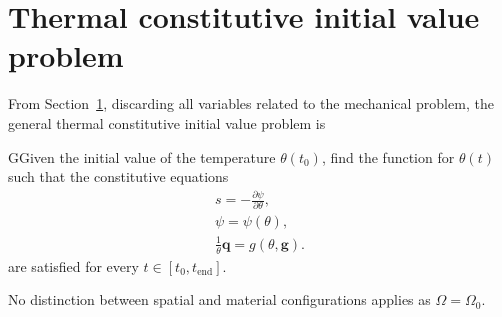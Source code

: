 \section{Thermal constitutive initial value problem}

From Section~\ref{}, discarding all variables related to the mechanical problem, the general thermal constitutive initial value problem is
\begin{problem}
GGiven the initial value of the temperature \(\theta(t_0)\), find the function for $\theta(t)$ such that the constitutive equations
\begin{gather}
    s = -\frac{\partial \psi}{\partial \theta},\\
    \psi = \psi(\theta),\\
    \frac{1}{\theta}\bm q = g(\theta, \bm g).
\end{gather}
are satisfied for every $t\in [t_0, t_\text{end}]$.
\end{problem}
No distinction between spatial and material configurations applies as \(\Omega = \Omega_0\).



